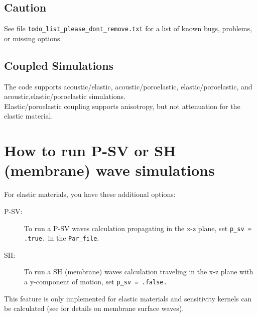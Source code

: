 \documentclass[oneside,english,onecolumn,letterpaper]{book}
\begin{document}
\subsection*{Caution}

See file \texttt{todo\_list\_please\_dont\_remove.txt} for a list of known bugs, problems, or missing options.


\subsection*{Coupled Simulations}


The code supports acoustic/elastic, acoustic/poroelastic, elastic/poroelastic,
and acoustic,elastic/poroelastic simulations.\\

\noindent
Elastic/poroelastic coupling supports anisotropy, but not attenuation for the
elastic material.


\section{How to run P-SV or SH (membrane) wave simulations}

For elastic materials, you have these additional options:
\begin{description}
\item[P-SV:]
To run a P-SV waves calculation propagating in the x-z plane,
set \texttt{p\_sv = .true.} in the \texttt{Par\_file}.

\item[SH:]
To run a SH (membrane) waves calculation traveling in the x-z plane with a
y-component of motion, set \texttt{p\_sv = .false.}

\end{description}
This feature is only implemented for elastic materials and sensitivity kernels
can be calculated (see \cite{TaLiTr07} for details on membrane
surface waves).
\end{document}
